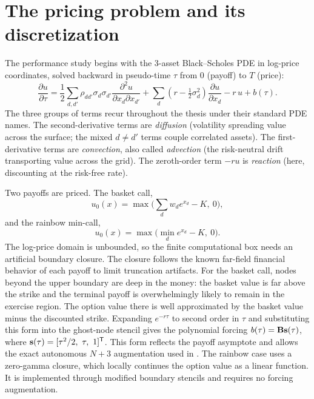 \section{The pricing problem and its discretization}\label{sec:model}

The performance study begins with the 3-asset Black--Scholes PDE \cite{black-scholes-1973} in log-price coordinates, solved backward in pseudo-time $\tau$ from 0 (payoff) to $T$ (price):
\begin{equation}
\frac{\partial u}{\partial \tau}
= \frac{1}{2} \sum_{d,d'} \rho_{dd'} \sigma_d \sigma_{d'}
  \frac{\partial^2 u}{\partial x_d \partial x_{d'}}
+ \sum_d \left(r - \tfrac{1}{2}\sigma_d^2\right) \frac{\partial u}{\partial x_d}
- r\, u + b(\tau).
\label{eq:bs-pde}
\end{equation}
The three groups of terms recur throughout the thesis under their standard PDE names. The second-derivative terms are \emph{diffusion} (volatility spreading value across the surface; the mixed $d \ne d'$ terms couple correlated assets). The first-derivative terms are \emph{convection}, also called \emph{advection} (the risk-neutral drift transporting value across the grid). The zeroth-order term $-ru$ is \emph{reaction} (here, discounting at the risk-free rate).

Two payoffs are priced. The basket call,
\[
u_0(x) = \max\!\Big(\sum_d w_d e^{x_d} - K,\ 0\Big),
\]
and the rainbow min-call,
\[
u_0(x) = \max\!\Big(\min_d e^{x_d} - K,\ 0\Big).
\]
The log-price domain is unbounded, so the finite computational box needs an artificial boundary closure. The closure follows the known far-field financial behavior of each payoff to limit truncation artifacts. For the basket call, nodes beyond the upper boundary are deep in the money: the basket value is far above the strike and the terminal payoff is overwhelmingly likely to remain in the exercise region. The option value there is well approximated by the basket value minus the discounted strike. Expanding $e^{-r\tau}$ to second order in $\tau$ and substituting this form into the ghost-node stencil gives the polynomial forcing $b(\tau)=\mathbf{B}\mathbf{s}(\tau)$, where
$\mathbf{s}(\tau)=[\tau^2/2,\ \tau,\ 1]^{\mathsf T}$. This form reflects the payoff asymptote and allows the exact autonomous $N+3$ augmentation used in . The rainbow case uses a zero-gamma closure, which locally continues the option value as a linear function. It is implemented through modified boundary stencils and requires no forcing augmentation.

